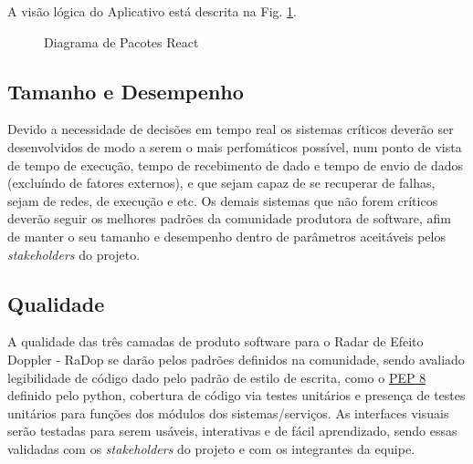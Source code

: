 A visão lógica do Aplicativo está descrita na Fig. \ref{fig:diagrama-pact-react}.

\begin{figure}[!htb]
    \caption{\label{fig:diagrama-pact-react}Diagrama de Pacotes React}
\end{figure}
\pagebreak

\subsection{Tamanho e Desempenho}\label{tamanho-e-desempenho}

Devido a necessidade de decisões em tempo real os sistemas críticos
deverão ser desenvolvidos de modo a serem o mais perfomáticos possível,
num ponto de vista de tempo de execução, tempo de recebimento de dado e
tempo de envio de dados (excluíndo de fatores externos), e que sejam
capaz de se recuperar de falhas, sejam de redes, de execução e etc. Os
demais sistemas que não forem críticos deverão seguir os melhores
padrões da comunidade produtora de software, afim de manter o seu
tamanho e desempenho dentro de parâmetros aceitáveis pelos
\emph{stakeholders} do projeto.

\subsection{Qualidade}\label{qualidade}

A qualidade das três camadas de produto software para o Radar de Efeito
Doppler - RaDop se darão pelos padrões definidos na comunidade, sendo
avaliado legibilidade de código dado pelo padrão de estilo de escrita,
como o \href{https://www.python.org/dev/peps/pep-0008/}{PEP 8} definido
pelo python, cobertura de código via testes unitários e presença de
testes unitários para funções dos módulos dos sistemas/serviços. As
interfaces visuais serão testadas para serem usáveis, interativas e de
fácil aprendizado, sendo essas validadas com os \emph{stakeholders} do
projeto e com os integrantes da equipe.
